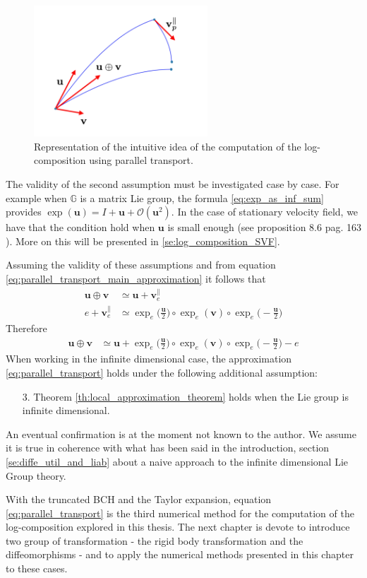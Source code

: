 \begin{figure}[htbp]
	\centering
	\includegraphics[width=6.5cm]{figures/u_plus_v_parallel_transported.pdf}
	\caption{Representation of the intuitive idea of the computation of the log-composition using parallel transport.}
	\label{fig:u_plus_v_parallel_transported}
\end{figure}
The validity of the second assumption must be investigated case by case. For example when $\mathbb{G}$ is a matrix Lie group, the formula \ref{eq:exp_as_inf_sum} provides $\exp(\mathbf{u}) = I + \mathbf{u} + \mathcal{O}(\mathbf{u}^2)$. In the case of stationary velocity field, we have that the condition hold when $\mathbf{u}$ is small enough (see proposition 8.6 pag. 163 \cite{younes2010shapes}). More on this will be presented in \ref{se:log_composition_SVF}.

Assuming the validity of these assumptions and from equation \ref{eq:parallel_transport_main_approximation} it follows that 
\begin{align*}
\mathbf{u}\oplus \mathbf{v}
&\simeq
\mathbf{u} + \mathbf{v}_{e}^{\parallel}
\\
e + \mathbf{v}_{e}^{\parallel}
&\simeq
\exp_{e}\big(\frac{\mathbf{u}}{2}\big)   
\circ  \exp_{e}(\mathbf{v}) 
\circ \exp_{e}\big(-\frac{\mathbf{u}}{2}\big)
\end{align*}
Therefore
\begin{align}\label{eq:parallel_transport}
\mathbf{u}\oplus \mathbf{v}
&\simeq
\mathbf{u} 
+
\exp_{e}\big(\frac{\mathbf{u}}{2}\big)   
\circ  \exp_{e}(\mathbf{v}) 
\circ \exp_{e}\big(-\frac{\mathbf{u}}{2}\big)
 -
 e
\end{align}
When working in the infinite dimensional case, the approximation \ref{eq:parallel_transport} holds under the following additional assumption:
\begin{enumerate}
\item[3.] Theorem \ref{th:local_approximation_theorem} holds when the Lie group is infinite dimensional.
\end{enumerate}
An eventual confirmation is at the moment not known to the author. We assume it is true in coherence with what has been said in the introduction, section \ref{se:diffe_util_and_liab} about a naive approach to the infinite dimensional Lie Group theory.

With the truncated BCH and the Taylor expansion, equation \ref{eq:parallel_transport} is the third numerical method for the computation of the log-composition explored in this thesis. The next chapter is devote to introduce two group of transformation - the rigid body transformation and the diffeomorphisms - and to apply the numerical methods presented in this chapter to these cases.





